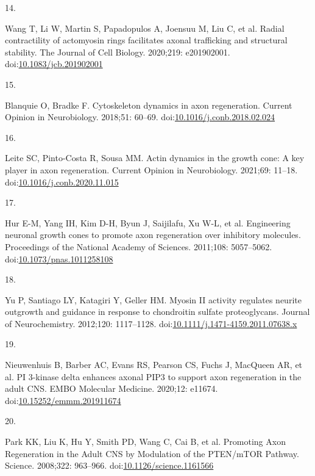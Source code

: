 \documentclass[
  12pt,
  a4paper,
]{book}
\newlength{\cslhangindent}
\newlength{\csllabelwidth}
\newlength{\cslentryspacingunit} %
\newenvironment{CSLReferences}[2] %
 {%
  \setlength{\parindent}{0pt}
  \ifodd #1
  \let\oldpar\par
  \def\par{\hangindent=\cslhangindent\oldpar}
  \fi
  \setlength{\parskip}{#2\cslentryspacingunit}
 }%
 {}
\newcommand{\CSLLeftMargin}[1]{\parbox[t]{\csllabelwidth}{#1}}
\newcommand{\CSLRightInline}[1]{\parbox[t]{\linewidth - \csllabelwidth}{#1}\break}
\begin{document}
\begin{CSLReferences}{0}{0}
\leavevmode{}%
\CSLLeftMargin{14. }%
\CSLRightInline{Wang T, Li W, Martin S, Papadopulos A, Joensuu M, Liu C, et al. Radial contractility of actomyosin rings facilitates axonal trafficking and structural stability. The Journal of Cell Biology. 2020;219: e201902001. doi:\href{https://doi.org/10.1083/jcb.201902001}{10.1083/jcb.201902001}}

\leavevmode{}%
\CSLLeftMargin{15. }%
\CSLRightInline{Blanquie O, Bradke F. Cytoskeleton dynamics in axon regeneration. Current Opinion in Neurobiology. 2018;51: 60--69. doi:\href{https://doi.org/10.1016/j.conb.2018.02.024}{10.1016/j.conb.2018.02.024}}

\leavevmode{}%
\CSLLeftMargin{16. }%
\CSLRightInline{Leite SC, Pinto-Costa R, Sousa MM. Actin dynamics in the growth cone: A key player in axon regeneration. Current Opinion in Neurobiology. 2021;69: 11--18. doi:\href{https://doi.org/10.1016/j.conb.2020.11.015}{10.1016/j.conb.2020.11.015}}

\leavevmode{}%
\CSLLeftMargin{17. }%
\CSLRightInline{Hur E-M, Yang IH, Kim D-H, Byun J, Saijilafu, Xu W-L, et al. Engineering neuronal growth cones to promote axon regeneration over inhibitory molecules. Proceedings of the National Academy of Sciences. 2011;108: 5057--5062. doi:\href{https://doi.org/10.1073/pnas.1011258108}{10.1073/pnas.1011258108}}

\leavevmode{}%
\CSLLeftMargin{18. }%
\CSLRightInline{Yu P, Santiago LY, Katagiri Y, Geller HM. Myosin {II} activity regulates neurite outgrowth and guidance in response to chondroitin sulfate proteoglycans. Journal of Neurochemistry. 2012;120: 1117--1128. doi:\href{https://doi.org/10.1111/j.1471-4159.2011.07638.x}{10.1111/j.1471-4159.2011.07638.x}}

\leavevmode{}%
\CSLLeftMargin{19. }%
\CSLRightInline{Nieuwenhuis B, Barber AC, Evans RS, Pearson CS, Fuchs J, MacQueen AR, et al. {PI} 3-kinase delta enhances axonal {PIP3} to support axon regeneration in the adult {CNS}. EMBO Molecular Medicine. 2020;12: e11674. doi:\href{https://doi.org/10.15252/emmm.201911674}{10.15252/emmm.201911674}}

\leavevmode{}%
\CSLLeftMargin{20. }%
\CSLRightInline{Park KK, Liu K, Hu Y, Smith PD, Wang C, Cai B, et al. Promoting {Axon Regeneration} in the {Adult CNS} by {Modulation} of the {PTEN}/{mTOR Pathway}. Science. 2008;322: 963--966. doi:\href{https://doi.org/10.1126/science.1161566}{10.1126/science.1161566}}


\end{CSLReferences}
\end{document}
